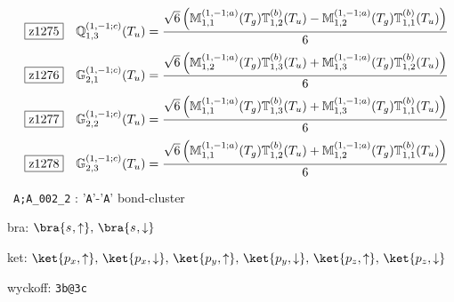 \documentclass[fleqn,10pt,landscape]{jsarticle}
\begin{document}
\begin{dmath*}
\hspace*{3mm}\fbox{z1275}\quad \mathbb{Q}_{1,3}^{(1,-1;c)}(T_{u})=\frac{\sqrt{6} \left(\mathbb{M}_{1,1}^{(1,-1;a)}(T_{g}) \mathbb{T}_{1,2}^{(b)}(T_{u}) - \mathbb{M}_{1,2}^{(1,-1;a)}(T_{g}) \mathbb{T}_{1,1}^{(b)}(T_{u})\right)}{6}
\end{dmath*}
\begin{dmath*}
\hspace*{3mm}\fbox{z1276}\quad \mathbb{G}_{2,1}^{(1,-1;c)}(T_{u})=\frac{\sqrt{6} \left(\mathbb{M}_{1,2}^{(1,-1;a)}(T_{g}) \mathbb{T}_{1,3}^{(b)}(T_{u}) + \mathbb{M}_{1,3}^{(1,-1;a)}(T_{g}) \mathbb{T}_{1,2}^{(b)}(T_{u})\right)}{6}
\end{dmath*}
\begin{dmath*}
\hspace*{3mm}\fbox{z1277}\quad \mathbb{G}_{2,2}^{(1,-1;c)}(T_{u})=\frac{\sqrt{6} \left(\mathbb{M}_{1,1}^{(1,-1;a)}(T_{g}) \mathbb{T}_{1,3}^{(b)}(T_{u}) + \mathbb{M}_{1,3}^{(1,-1;a)}(T_{g}) \mathbb{T}_{1,1}^{(b)}(T_{u})\right)}{6}
\end{dmath*}
\begin{dmath*}
\hspace*{3mm}\fbox{z1278}\quad \mathbb{G}_{2,3}^{(1,-1;c)}(T_{u})=\frac{\sqrt{6} \left(\mathbb{M}_{1,1}^{(1,-1;a)}(T_{g}) \mathbb{T}_{1,2}^{(b)}(T_{u}) + \mathbb{M}_{1,2}^{(1,-1;a)}(T_{g}) \mathbb{T}_{1,1}^{(b)}(T_{u})\right)}{6}
\end{dmath*}
\vspace{5mm}

\noindent\textbullet\, \texttt{A;A_002_2} : '\texttt{A}'-'\texttt{A}' bond-cluster

\noindent\quad * bra: $\bra{s_{},\uparrow},\, \bra{s_{},\downarrow}$

\noindent\quad * ket: $\ket{p_{x},\uparrow},\, \ket{p_{x},\downarrow},\, \ket{p_{y},\uparrow},\, \ket{p_{y},\downarrow},\, \ket{p_{z},\uparrow},\, \ket{p_{z},\downarrow}$

\noindent\quad * wyckoff: \texttt{3b@3c}
\end{document}
